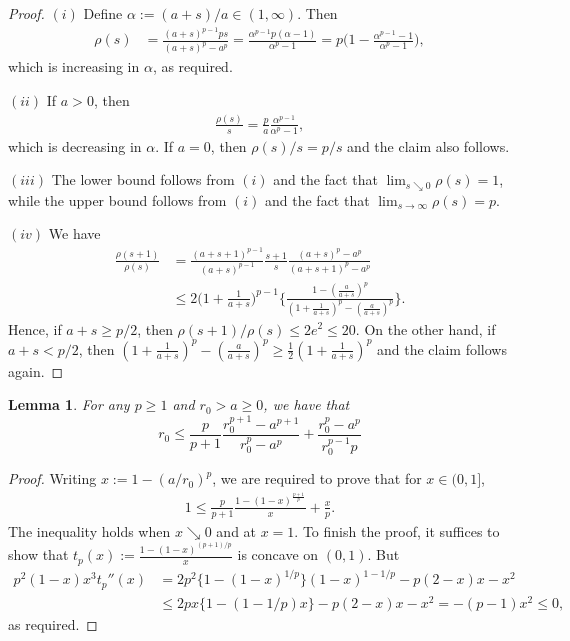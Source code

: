 \documentclass[a4paper,12pt]{article}
\newtheorem{lemma}[theorem]{Lemma}
\begin{document}
\begin{proof}
$(i)$ Define $\alpha := (a+s)/a \in (1,\infty)$.  Then
  \begin{align*}
    \rho(s) & =  \frac{(a + s)^{p-1} p s}{(a + s)^p - a^p} = \frac{ \alpha^{p-1} p (\alpha - 1)}{\alpha^p - 1} 
              = p \biggl( 1 - \frac{\alpha^{p-1} - 1}{\alpha^p - 1} \biggr),
  \end{align*}
which is increasing in $\alpha$, as required.

$(ii)$ If $a > 0$, then
  \begin{align*}
    \frac{\rho(s)}{s} = \frac{p}{a} \frac{\alpha^{p-1} }{\alpha^p - 1},
  \end{align*}
which is decreasing in $\alpha$. If $a = 0$, then $\rho(s)/s = p/s$ and the claim also follows.

$(iii)$ The lower bound follows from $(i)$ and the fact that $\lim_{s \searrow 0} \rho(s) = 1$, while the upper bound follows from $(i)$ and the fact that $\lim_{s \rightarrow \infty} \rho(s) = p$.

$(iv)$ We have
  \begin{align*}
    \frac{\rho(s+1)}{\rho(s)} &= \frac{(a + s + 1)^{p-1}}{(a + s)^{p-1}} \frac{s+1}{s} \frac{(a + s)^p - a^p}{(a + s+ 1)^p - a^p} \\
                              &\leq 2 \biggl( 1 + \frac{1}{a + s} \biggr)^{p-1}
                                \biggl\{ \frac{1 - ( \frac{a}{a+s} )^p}
                                { (1 + \frac{1}{a + s})^p - ( \frac{a}{a + s} )^p } \biggr\}.
  \end{align*}
Hence, if $a + s \geq p/2$, then $\rho(s+1)/\rho(s) \leq 2 e^2 \leq 20$. On the other hand, if $a + s < p/2$, then $(1 + \frac{1}{a + s})^p - (\frac{a}{a + s})^p \geq \frac{1}{2} (1 + \frac{1}{a + s})^p$ and the claim follows again. 
\end{proof}

\begin{lemma}
  \label{Lem:EvilInequality}
  For any $p \geq 1$ and $r_0 > a \geq 0$, we have that
  \[
    r_0 \leq \frac{p}{p+1} \frac{r_0^{p+1} - a^{p+1}}{r_0^p - a^p}
    + \frac{r_0^p - a^p}{r_0^{p-1}  p}
  \]
\end{lemma}
\begin{proof}
Writing $x := 1 - (a/r_0)^p$, we are required to prove that for $x \in (0,1]$,
  \begin{align}
    1 \leq \frac{p}{p+1} \frac{1 - (1-x)^{\frac{p+1}{p}}}{x} + \frac{x}{p}.
  \end{align}
The inequality holds when $x \searrow 0$ and at $x = 1$. To finish the proof, it suffices to show that $t_p(x) := \frac{1 - (1 - x)^{(p+1)/p}}{x}$ is concave on $(0,1)$.  But
\begin{align*}
p^2(1-x)x^3 t_p''(x) &= 2p^2\bigl\{1 - (1-x)^{1/p}\}(1-x)^{1-1/p} - p(2-x)x - x^2 \\
&\leq 2px\bigl\{1 - (1-1/p)x\bigr\} - p(2-x)x - x^2 = -(p-1)x^2 \leq 0,
\end{align*}
as required.
\end{proof}
\end{document}
